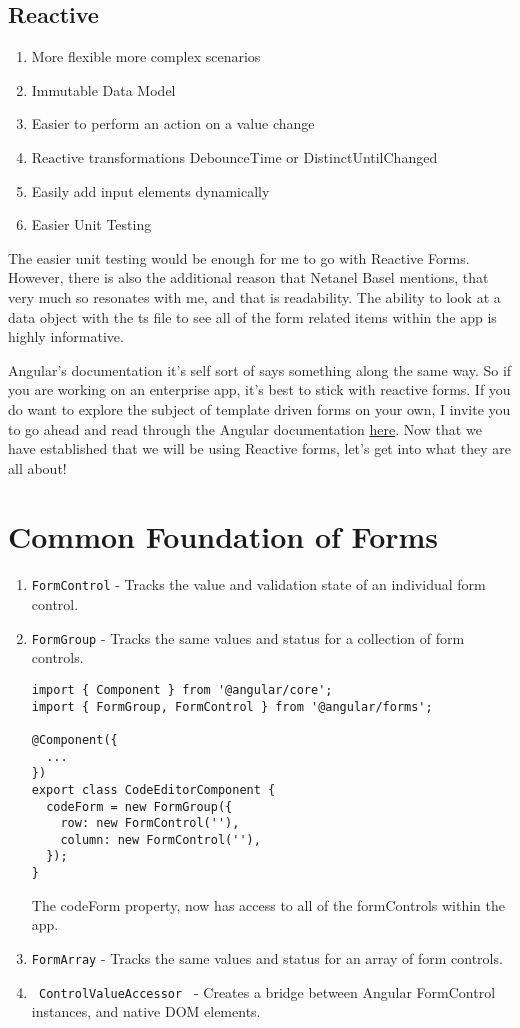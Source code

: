 \subsection{ Reactive }
\begin{enumerate}
  \item More flexible \textrightarrow{} more complex scenarios
  \item Immutable Data Model
  \item Easier to perform an action on a value change
  \item Reactive transformations \textrightarrow{} DebounceTime or DistinctUntilChanged
  \item Easily add input elements dynamically
  \item Easier Unit Testing
\end{enumerate}

The easier unit testing would be enough for me to go with Reactive Forms. However, there is also the additional reason that Netanel Basel mentions, that very much so resonates with me, and that is readability. The ability to look at a data object with the ts  file to see all of the form related items within the app is highly informative.

Angular's documentation it's self sort of says something along the same way. So if you are working on an enterprise app, it's best to stick with reactive forms. If you do want to explore the subject of template driven forms on your own, I invite you to go ahead and read through the Angular documentation 
\href{https://angular.io/guide/forms-overview#setup-in-template-driven-forms}{here}. Now that we have established that we will be using Reactive forms, let's get into what they are all about!

\section{ Common Foundation of Forms }
\begin{enumerate}
  \item \lstinline{FormControl} - Tracks the value and validation state of an 
  individual form control.
  \item \lstinline{FormGroup} - Tracks the same values and status for a 
  collection of form controls.
\begin{lstlisting}
import { Component } from '@angular/core';
import { FormGroup, FormControl } from '@angular/forms';
 
@Component({
  ...
})
export class CodeEditorComponent {
  codeForm = new FormGroup({
    row: new FormControl(''),
    column: new FormControl(''),
  });
}
\end{lstlisting}
  The codeForm property, now has access to all of the formControls within the
  app.
  \item \lstinline{FormArray} - Tracks the same values and status for an array
  of form controls. 
  \item \lstinline{ ControlValueAccessor } - Creates a bridge between Angular
  FormControl instances, and native DOM elements.
\end{enumerate}

